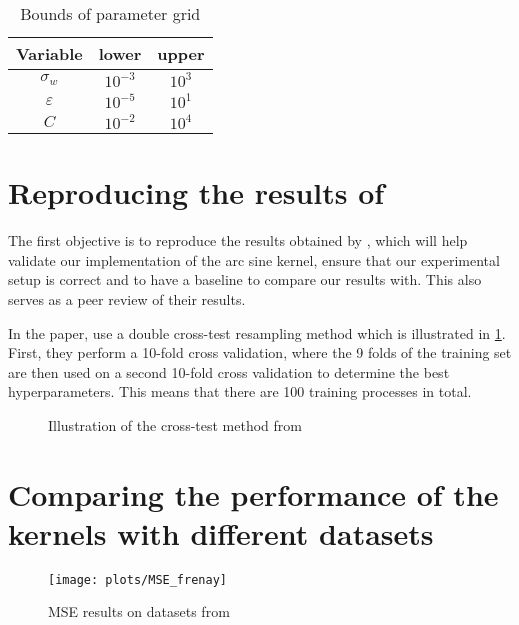\begin{table}[H]
    \caption{Bounds of parameter grid}%
    \label{tab:paramgrid}
    \begin{tabular}{ccc}
        \toprule
        Variable      & lower     & upper  \\
        \midrule
        $\sigma_w$    & $10^{-3}$ & $10^3$ \\
        $\varepsilon$ & $10^{-5}$ & $10^1$ \\
        $C$           & $10^{-2}$ & $10^4$ \\
        \bottomrule
    \end{tabular}
\end{table}

\section{Reproducing the results of \texorpdfstring{\citeauthor{frenayParameterinsensitiveKernelExtreme2011}}{Frénay and Verleysen}}
\label{sec:reproducing-frenay}

The first objective is to reproduce the results obtained by
\textcite{frenayParameterinsensitiveKernelExtreme2011}, which will help validate
our implementation of the arc sine kernel, ensure that our experimental setup is
correct and to have a baseline to compare our results with. This also serves as
a peer review of their results.

In the paper, \citeauthor{frenayParameterinsensitiveKernelExtreme2011} use a
double cross-test resampling method which is illustrated in
\cref{fig:frenay-cross-test}. First, they perform a 10-fold cross validation,
where the 9 folds of the training set are then used on a second 10-fold cross
validation to determine the best hyperparameters. This means that there are 100
training processes in total.

\begin{figure}[H]
    
    \caption{Illustration of the cross-test method from \cite{frenayParameterinsensitiveKernelExtreme2011}}
    \label{fig:frenay-cross-test}
\end{figure}

\section{Comparing the performance of the kernels with different datasets}%

\begin{figure}
    \texttt{[image: plots/MSE\_frenay]}
    \caption{MSE results on datasets from \cite{frenayParameterinsensitiveKernelExtreme2011}}
\end{figure}


